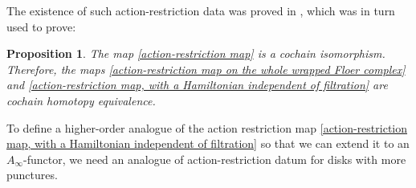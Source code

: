 \documentclass{amsart}
\newtheorem{proposition}[theorem]{Proposition}
\numberwithin{equation}{section}
\numberwithin{figure}{section}
\begin{document}
	The existence of such action-restriction data was proved in \cite{Gao1}, which was in turn used to prove: \par
	
\begin{proposition}
	The map \eqref{action-restriction map} is a cochain isomorphism. Therefore, the maps \eqref{action-restriction map on the whole wrapped Floer complex} and \eqref{action-restriction map, with a Hamiltonian independent of filtration} are cochain homotopy equivalence.
\end{proposition}

	To define a higher-order analogue of the action restriction map \eqref{action-restriction map, with a Hamiltonian independent of filtration} so that we can extend it to an $A_{\infty}$-functor, we need an analogue of action-restriction datum for disks with more punctures. \par
\end{document}
